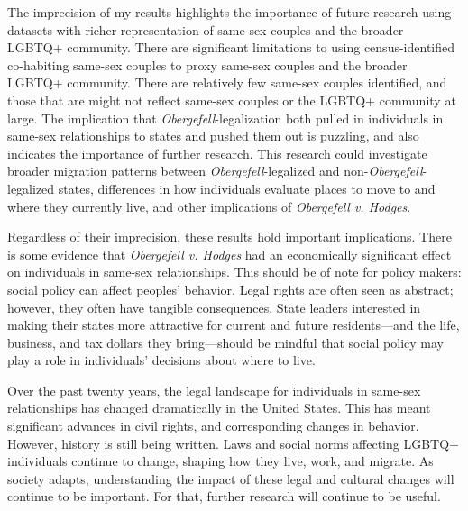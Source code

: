 \documentclass[12pt,letterpaper]{article}
\begin{document}
The imprecision of my results highlights the importance of future research using datasets with richer representation of same-sex couples and the broader LGBTQ+ community. There are significant limitations to using census-identified co-habiting same-sex couples to proxy same-sex couples and the broader LGBTQ+ community. There are relatively few same-sex couples identified, and those that are might not reflect same-sex couples or the LGBTQ+ community at large. The implication that \textit{Obergefell}-legalization both pulled in individuals in same-sex relationships to states and pushed them out is puzzling, and also indicates the importance of further research. This research could investigate broader migration patterns between \textit{Obergefell}-legalized and non-\textit{Obergefell}-legalized states, differences in how individuals evaluate places to move to and where they currently live, and other implications of \textit{Obergefell v. Hodges}. 

Regardless of their imprecision, these results hold important implications. There is some evidence that \textit{Obergefell v. Hodges} had an economically significant effect on individuals in same-sex relationships. This should be of note for policy makers: social policy can affect peoples' behavior. Legal rights are often seen as abstract; however, they often have tangible consequences. State leaders interested in making their states more attractive for current and future residents---and the life, business, and tax dollars they bring---should be mindful that social policy may play a role in individuals' decisions about where to live. 


Over the past twenty years, the legal landscape for individuals in same-sex relationships has changed dramatically in the United States. This has meant significant advances in civil rights, and corresponding changes in behavior. However, history is still being written. Laws and social norms affecting LGBTQ+ individuals continue to change, shaping how they live, work, and migrate. As society adapts, understanding the impact of these legal and cultural changes will continue to be important. For that, further research will continue to be useful.

\newpage


\end{document}
